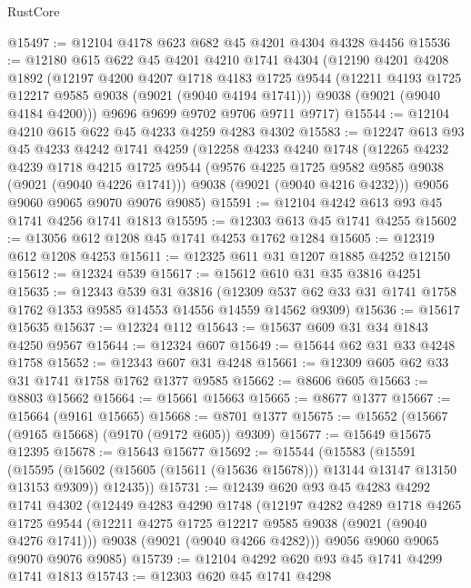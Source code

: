 \begin{lexlean}{RustCore}
\begin{coremodule}
@15497 := @12104 @4178 @623 @682 @45 @4201 @4304 @4328 @4456
@15536 := @12180
    @615
    @622
    @45
    @4201
    @4210
    @1741
    @4304
    (@12190
      @4201
      @4208
      @1892
      (@12197
        @4200
        @4207
        @1718
        @4183
        @1725
        @9544
        (@12211 @4193 @1725 @12217 @9585 @9038 (@9021 (@9040 @4194 @1741)))
        @9038
        (@9021 (@9040 @4184 @4200)))
      @9696
      @9699
      @9702
      @9706
      @9711
      @9717)
@15544 := @12104 @4210 @615 @622 @45 @4233 @4259 @4283 @4302
@15583 := @12247
    @613
    @93
    @45
    @4233
    @4242
    @1741
    @4259
    (@12258
      @4233
      @4240
      @1748
      (@12265
        @4232
        @4239
        @1718
        @4215
        @1725
        @9544
        (@9576 @4225 @1725 @9582 @9585 @9038 (@9021 (@9040 @4226 @1741)))
        @9038
        (@9021 (@9040 @4216 @4232)))
      @9056
      @9060
      @9065
      @9070
      @9076
      @9085)
@15591 := @12104 @4242 @613 @93 @45 @1741 @4256 @1741 @1813
@15595 := @12303 @613 @45 @1741 @4255
@15602 := @13056 @612 @1208 @45 @1741 @4253 @1762 @1284
@15605 := @12319 @612 @1208 @4253
@15611 := @12325 @611 @31 @1207 @1885 @4252 @12150
@15612 := @12324 @539
@15617 := @15612 @610 @31 @35 @3816 @4251
@15635 := @12343
    @539
    @31
    @3816
    (@12309 @537 @62 @33 @31 @1741 @1758 @1762 @1353 @9585 @14553 @14556 @14559 @14562 @9309)
@15636 := @15617 @15635
@15637 := @12324 @112
@15643 := @15637 @609 @31 @34 @1843 @4250 @9567
@15644 := @12324 @607
@15649 := @15644 @62 @31 @33 @4248 @1758
@15652 := @12343 @607 @31 @4248
@15661 := @12309 @605 @62 @33 @31 @1741 @1758 @1762 @1377 @9585
@15662 := @8606 @605
@15663 := @8803 @15662
@15664 := @15661 @15663
@15665 := @8677 @1377
@15667 := @15664 (@9161 @15665)
@15668 := @8701 @1377
@15675 := @15652 (@15667 (@9165 @15668) (@9170 (@9172 @605)) @9309)
@15677 := @15649 @15675 @12395
@15678 := @15643 @15677
@15692 := @15544
    (@15583
      (@15591
        (@15595 (@15602 (@15605 (@15611 (@15636 @15678))) @13144 @13147 @13150 @13153 @9309))
        @12435))
@15731 := @12439
    @620
    @93
    @45
    @4283
    @4292
    @1741
    @4302
    (@12449
      @4283
      @4290
      @1748
      (@12197
        @4282
        @4289
        @1718
        @4265
        @1725
        @9544
        (@12211 @4275 @1725 @12217 @9585 @9038 (@9021 (@9040 @4276 @1741)))
        @9038
        (@9021 (@9040 @4266 @4282)))
      @9056
      @9060
      @9065
      @9070
      @9076
      @9085)
@15739 := @12104 @4292 @620 @93 @45 @1741 @4299 @1741 @1813
@15743 := @12303 @620 @45 @1741 @4298

\end{coremodule}
\end{lexlean}
